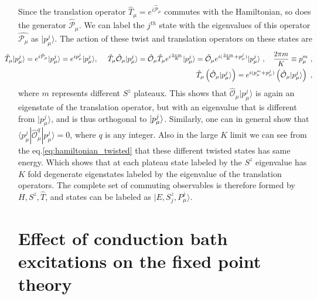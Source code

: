 \documentclass[12pt]{iopart}
\begin{document}
Since the translation operator $\hat{T}_{\mu}=e^{i\hat{\mathcal{P}}_{\mu}}$ commutes with the Hamiltonian, so does the generator $\hat{\mathcal{P}}_{\mu}$. We can label the $j^{th}$ state with the eigenvalues of this operator $\hat{\mathcal{P}_{\mu}}$ as $|p^{j}_{\mu}\rangle$. The action of these twist and translation operators on these states are
\begin{eqnarray}
\hspace*{-20pt}\hat{T}_{\mu} |p^j_{\mu} \rangle = e^{i\hat{\mathcal{P}}_{\mu}} |p^j_{\mu} \rangle = e^{ip^j_{\mu}} |p^j_{\mu}\rangle, ~ ~ ~ ~ \hat{T}_{\mu} \hat{\mathcal{O}}_{\mu} |p^j_{\mu} \rangle =  \hat{\mathcal{O}}_{\mu} \hat{T}_{\mu} e^{i\frac{2\pi m}{K}} |p^j_{\mu}\rangle = \hat{\mathcal{O}}_{\mu}   e^{i(\frac{2\pi m}{K}+p_{\mu}^j)} |p^j_{\mu}\rangle~,\quad\frac{2\pi m}{K} \equiv p_{\mu}^{m}~, \nonumber\\
\hspace*{-20pt}\hat{T}_{\mu} \left( \hat{\mathcal{O}}_{\mu} |p^j_{\mu} \rangle  \right) = e^{i(p_{\mu}^{m}+p_{\mu}^j)} \left( \hat{\mathcal{O}}_{\mu}    |p^j_{\mu}\rangle \right)~,
\end{eqnarray}
where $m$ represents different $S^z$ plateaux. This shows that  $\hat{\mathcal{O}}_{\mu} |p^j_{\mu} \rangle $ is again an eigenstate of the translation operator, but with an eigenvalue that is different from $|p^j_{\mu} \rangle $, and is thus orthogonal to $\ket{p^j_{\mu}}$. Similarly, one can in general show that $\langle p^j_{\mu} | \hat{\mathcal{O}}^{q}_{\mu} |p^j_{\mu} \rangle=0$, where $q$ is any integer. Also in the large $K$ limit we can see from the eq.\eqref{eq:hamiltonian_twisted} that these different twisted states has same energy. Which shows that at each plateau state labeled by the $S^z$ eigenvalue has $K$ fold degenerate eigenstates labeled by the eigenvalue of the translation operators. The complete set of commuting observables is therefore formed by $H,S^z,\hat{T}$, and states can be labeled as  $|E,S^z_j,P^j_{\mu}\rangle$. 




\section{Effect of conduction bath excitations on the fixed point theory}
\end{document}
